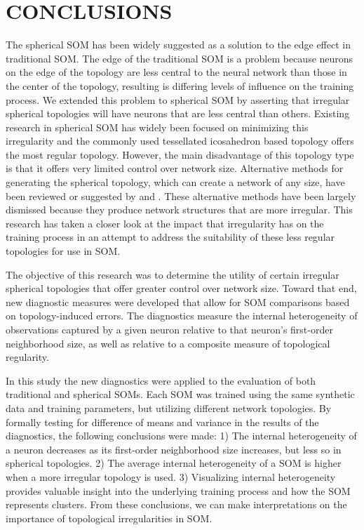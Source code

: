 \chapter{CONCLUSIONS}
The spherical SOM has been widely suggested as a solution to the edge effect
in traditional SOM.  The edge of the traditional SOM is a problem because neurons on
the edge of the topology are less central to the neural network than those in
the center of the topology, resulting is differing levels of influence on the
training process.  We extended this problem to spherical SOM by
asserting that irregular spherical topologies will have neurons that are less
central than others.  Existing research in spherical SOM has widely been
focused on minimizing this irregularity and the commonly used tessellated
icosahedron based topology offers the most regular topology. However, the main
disadvantage of this topology type is that it offers very limited control over
network size.  Alternative methods for generating the spherical topology,
which can create a network of any size, have been reviewed or suggested by
\cite{wu2005} and \cite{Nishio:2006fk}.  These alternative methods have been
largely dismissed because they produce network structures that are more irregular.
This research has taken a closer look at the impact that irregularity has on
the training process in an attempt to address the suitability of these less regular
topologies for use in SOM.

The objective of this research was to determine the utility of certain
irregular spherical topologies that offer greater control over
network size.  Toward that end, new diagnostic measures were developed that
allow for SOM comparisons based on topology-induced errors.  The diagnostics
measure the internal heterogeneity of observations captured by a given neuron
relative to that neuron's first-order neighborhood size, as well as relative
to a composite measure of topological regularity.

In this study the new diagnostics were applied to the evaluation of both
traditional and spherical SOMs. Each SOM was trained using the same synthetic
data and training parameters, but utilizing different network topologies.  By
formally testing for difference of means and variance in the results of the
diagnostics, the following conclusions were made: 1) The internal
heterogeneity of a neuron decreases as its first-order neighborhood size
increases, but less so in spherical topologies.  2) The average internal
heterogeneity of a SOM is higher when a more irregular topology is used.  3)
Visualizing internal heterogeneity provides valuable insight into the
underlying training process and how the SOM represents clusters. From these
conclusions, we can make interpretations on the importance of topological
irregularities in SOM.

